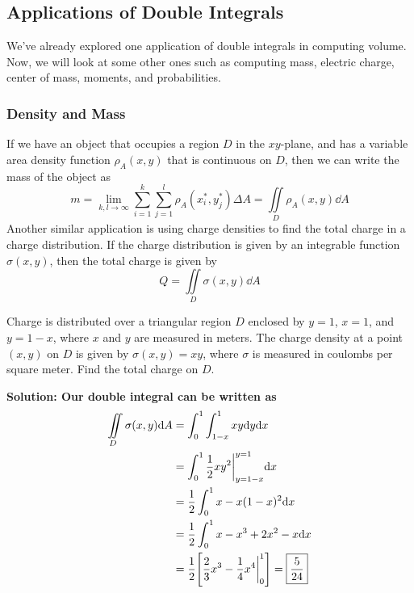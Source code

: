 \subsection{Applications of Double Integrals}
We've already explored one application of double integrals in computing volume. Now, we will look at some other ones such as computing mass, electric charge, center of mass, moments, and probabilities.
\subsubsection{Density and Mass}
If we have an object that occupies a region \( D \) in the \( xy \)-plane, and has a variable area density function \( \rho_A(x,y) \) that is continuous on \( D \), then we can write the mass of the object as 
\[ m = \lim_{k,l\to\infty}\sum_{i=1}^k\sum_{j=1}^l \rho_A(x_i^*, y_j^*)\Delta A = \iint\limits_D \rho_A(x,y)\dd A \]
Another similar application is using charge densities to find the total charge in a charge distribution. If the charge distribution is given by an integrable function \( \sigma(x,y) \), then the total charge is given by
\[ Q = \iint\limits_D \sigma(x,y)\dd A \]
\begin{example}
    Charge is distributed over a triangular region \( D \) enclosed by \( y=1 \), \( x=1 \), and \( y=1-x \), where \( x \) and \( y \) are measured in meters. The charge density at a point \( (x,y) \) on \( D \) is given by \( \sigma(x,y)=xy \), where \( \sigma \) is measured in coulombs per square meter. Find the total charge on \( D \). \par\bf{Solution}: Our double integral can be written as
    \begin{align*}
        \iint\limits_D\sigma(x,y)\dd A &= \int_0^1\int_{1-x}^{1}xy\dd y\dd x \\
        &= \int_0^1 \frac{1}{2}xy^2\biggr|_{y=1-x}^{y=1}\dd x \\
        &= \frac{1}{2}\int_0^1x - x(1-x)^2 \dd x \\
        &= \frac{1}{2}\int_0^1 x - x^3 + 2x^2 - x\dd x \\
        &= \frac{1}{2}\bqty{\frac{2}{3}x^3-\frac{1}{4}x^4\biggr|_{0}^1} = \boxed{\frac{5}{24}}
    \end{align*}
\end{example}
